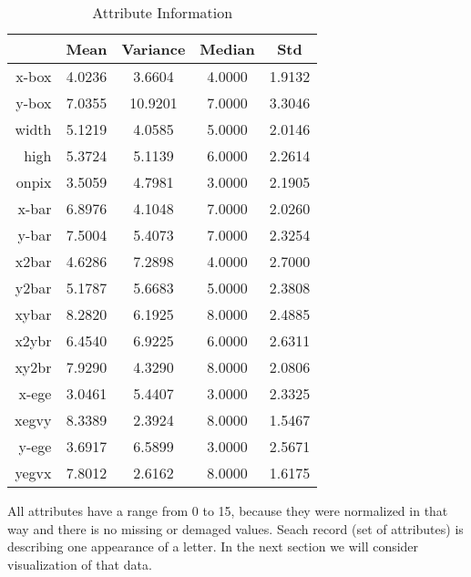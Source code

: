 \begin{table}[ht!]
    \centering
    \begin{tabular}{|r|c|c|c|c|}
         \hline
              & Mean & Variance & Median & Std \\ \hline
             x-box & 4.0236 &  3.6604 &  4.0000 &  1.9132 \\ \hline
             y-box & 7.0355 & 10.9201 &  7.0000 &  3.3046 \\ \hline
             width & 5.1219 &  4.0585 &  5.0000 &  2.0146 \\ \hline
             high  & 5.3724 &  5.1139 &  6.0000 &  2.2614 \\ \hline
             onpix & 3.5059 &  4.7981 &  3.0000 &  2.1905 \\ \hline
             x-bar & 6.8976 &  4.1048 &  7.0000 &  2.0260 \\ \hline
             y-bar & 7.5004 &  5.4073 &  7.0000 &  2.3254 \\ \hline
             x2bar & 4.6286 &  7.2898 &  4.0000 &  2.7000 \\ \hline
             y2bar & 5.1787 &  5.6683 &  5.0000 &  2.3808 \\ \hline
             xybar & 8.2820 &  6.1925 &  8.0000 &  2.4885 \\ \hline
             x2ybr & 6.4540 &  6.9225 &  6.0000 &  2.6311 \\ \hline
             xy2br & 7.9290 &  4.3290 &  8.0000 &  2.0806 \\ \hline
             x-ege & 3.0461 &  5.4407 &  3.0000 &  2.3325 \\ \hline
             xegvy & 8.3389 &  2.3924 &  8.0000 &  1.5467 \\ \hline
             y-ege & 3.6917 &  6.5899 &  3.0000 &  2.5671 \\ \hline
             yegvx & 7.8012 &  2.6162 &  8.0000 &  1.6175 \\ \hline
    \end{tabular}
    \caption{Attribute Information}
\end{table}

All attributes have a range from 0 to 15, because they were normalized in that way
and there is no missing or demaged values. Seach record (set of attributes) is
describing one appearance of a letter. In the next section we will consider
visualization of that data.


